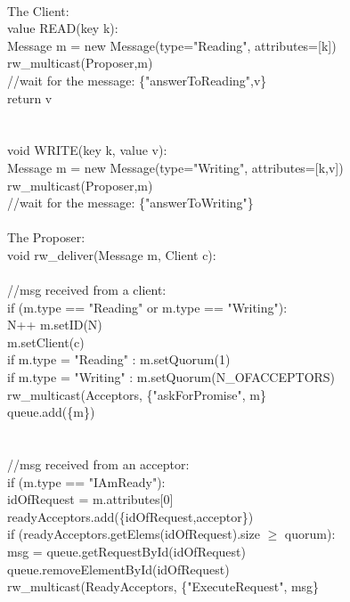 \documentclass[paper=a4, fontsize=11pt]{scrartcl} %
\numberwithin{equation}{section} %
\numberwithin{figure}{section} %
\numberwithin{table}{section} %
\begin{document}
~\\
The Client:\\
{\selectfont 
value READ(key k): \\
\quad \quad Message m = new Message(type="Reading", attributes=[k]) \\
\quad \quad rw\_multicast(Proposer,m) \\
\quad \quad //wait for the message: \{"answerToReading",v\} \\
\quad \quad return v \\
~\\
~\\
void WRITE(key k, value v): \\
\quad \quad Message m = new Message(type="Writing", attributes=[k,v]) \\
\quad \quad rw\_multicast(Proposer,m) \\
\quad \quad //wait for the message: \{"answerToWriting"\} \\
}
~\\
The Proposer:\\
{\selectfont 
void rw\_deliver(Message m, Client c): \\
~\\
//msg received from a client:\\
\quad \quad if (m.type == "Reading" or m.type == "Writing"): \\
\quad \quad \quad \quad N++
\quad \quad \quad \quad m.setID(N) \\
\quad \quad \quad \quad m.setClient(c) \\
\quad \quad \quad \quad if m.type = "Reading" : m.setQuorum(1) \\
\quad \quad \quad \quad if m.type = "Writing" : m.setQuorum(N\_OFACCEPTORS) \\
\quad \quad \quad \quad rw\_multicast(Acceptors, \{"askForPromise", m\} \\
\quad \quad \quad \quad queue.add(\{m\}) \\
~\\
~\\//msg received from an acceptor:\\
\quad \quad if (m.type == "IAmReady"): \\
\quad \quad \quad \quad idOfRequest = m.attributes[0]\\
\quad \quad \quad \quad readyAcceptors.add(\{idOfRequest,acceptor\}) \\
\quad \quad \quad \quad if (readyAcceptors.getElems(idOfRequest).size $\geq$ quorum): \\
\quad \quad \quad \quad \quad msg = queue.getRequestById(idOfRequest)\\
\quad \quad \quad \quad \quad queue.removeElementById(idOfRequest)\\
\quad \quad \quad \quad \quad rw\_multicast(ReadyAcceptors, \{"ExecuteRequest", msg\} 
~\\
}
\end{document}
